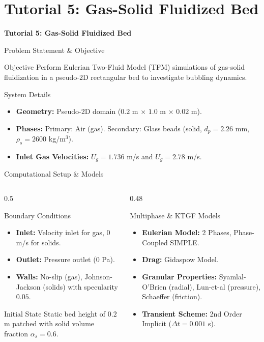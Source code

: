 \documentclass[aspectratio=169]{beamer}
\newcommand{\bi}{\begin{itemize}}
\newcommand{\ei}{\end{itemize}}
\newcommand{\im}{\item}
\begin{document}
\section{Tutorial 5: Gas-Solid Fluidized Bed}
\begin{frame}
    \centering \Huge \textbf{Tutorial 5: Gas-Solid Fluidized Bed}
\end{frame}
\begin{frame}{Problem Statement \& Objective}
    \begin{block}{Objective}
    Perform Eulerian Two-Fluid Model (TFM) simulations of gas-solid fluidization in a pseudo-2D rectangular bed to investigate bubbling dynamics.
    \end{block}
    \vspace{0.3cm}
    \begin{block}{System Details}
    \bi
        \im \textbf{Geometry:} Pseudo-2D domain ($0.2$ m $\times$ $1.0$ m $\times$ $0.02$ m).
        \im \textbf{Phases:} Primary: Air (gas). Secondary: Glass beads (solid, $d_p = 2.26$ mm, $\rho_s = 2600$ kg/m$^3$).
        \im \textbf{Inlet Gas Velocities:} $U_g = 1.736$ m/s and $U_g = 2.78$ m/s.
    \ei
    \end{block}
\end{frame}

\begin{frame}{Computational Setup \& Models}
    \begin{columns}[T]
        \begin{column}{0.5\textwidth}
            \begin{block}{Boundary Conditions}
            \bi
                \im \textbf{Inlet:} Velocity inlet for gas, $0$ m/s for solids.
                \im \textbf{Outlet:} Pressure outlet ($0$ Pa).
                \im \textbf{Walls:} No-slip (gas), Johnson-Jackson (solids) with specularity $0.05$.
            \ei
            \end{block}
            \begin{block}{Initial State}
            Static bed height of $0.2$ m patched with solid volume fraction $\alpha_s = 0.6$.
            \end{block}
        \end{column}
        \begin{column}{0.48\textwidth}
            \begin{block}{Multiphase \& KTGF Models}
            \bi
                \im \textbf{Eulerian Model:} 2 Phases, Phase-Coupled SIMPLE.
                \im \textbf{Drag:} Gidaspow Model.
                \im \textbf{Granular Properties:} Syamlal-O'Brien (radial), Lun-et-al (pressure), Schaeffer (friction).
                \im \textbf{Transient Scheme:} 2nd Order Implicit ($\Delta t = 0.001$ s).
            \ei
            \end{block}
        \end{column}
    \end{columns}
\end{frame}
\end{document}
